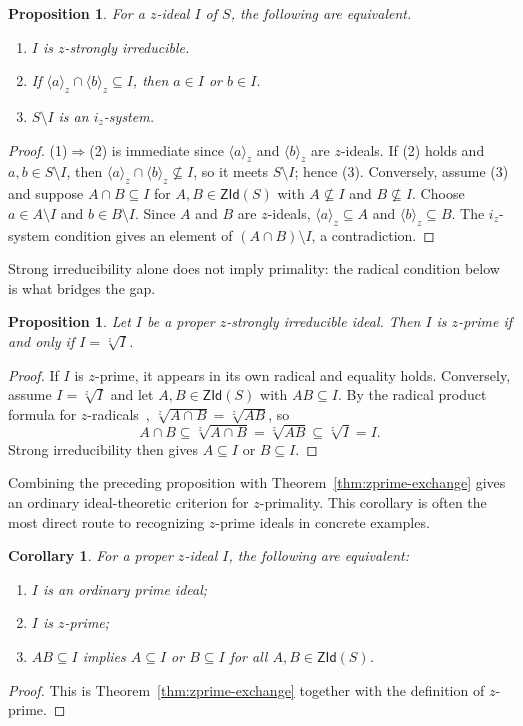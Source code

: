 \documentclass[11pt,leqno]{amsart}
\theoremstyle{plain}
\newtheorem{proposition}[theorem]{Proposition}
\newtheorem{corollary}[theorem]{Corollary}
\theoremstyle{definition}
\theoremstyle{remark}
\numberwithin{equation}{section}
\newcommand{\ZId}{\mathsf{ZId}}
\newcommand{\ideal}[1]{\langle #1\rangle}
\begin{document}
\begin{proposition}\label{loc14}
For a $z$-ideal $I$ of $S$, the following are equivalent.
\begin{enumerate}
\item $I$ is $z$-strongly irreducible.
\item If $\ideal{a}_z\cap\ideal{b}_z\subseteq I$, then $a\in I$ or $b\in I$.
\item $S\setminus I$ is an $i_z$-system.
\end{enumerate}
\end{proposition}
\begin{proof}
(1)$\Rightarrow$(2) is immediate since $\ideal{a}_z$ and $\ideal{b}_z$
are $z$-ideals.
If (2) holds and $a,b\in S\setminus I$, then
$\ideal{a}_z\cap\ideal{b}_z\not\subseteq I$,
so it meets $S\setminus I$; hence (3).
Conversely, assume (3) and suppose $A\cap B\subseteq I$ for
$A,B\in\ZId(S)$ with $A\not\subseteq I$ and $B\not\subseteq I$.
Choose $a\in A\setminus I$ and $b\in B\setminus I$.
Since $A$ and $B$ are $z$-ideals,
$\ideal{a}_z\subseteq A$ and $\ideal{b}_z\subseteq B$.
The $i_z$-system condition gives an element of $(A\cap B)\setminus I$,
a contradiction.
\end{proof}

Strong irreducibility alone does not imply primality:
the radical condition below is what bridges the gap.

\begin{proposition}\label{prop:zstrong-prime-radical}
Let $I$ be a proper $z$-strongly irreducible ideal.
Then $I$ is $z$-prime if and only if $I=\sqrt[z]{I}$.
\end{proposition}
\begin{proof}
If $I$ is $z$-prime, it appears in its own radical and equality holds.
Conversely, assume $I=\sqrt[z]{I}$ and let $A,B\in\ZId(S)$ with
$AB\subseteq I$.
By the radical product formula for $z$-radicals~\cite{AG25},
$\sqrt[z]{A\cap B}=\sqrt[z]{AB}$, so
\[
A\cap B\subseteq\sqrt[z]{A\cap B}=\sqrt[z]{AB}\subseteq\sqrt[z]{I}=I.
\]
Strong irreducibility then gives $A\subseteq I$ or $B\subseteq I$.
\end{proof}

Combining the preceding proposition with Theorem~\ref{thm:zprime-exchange}
gives an ordinary ideal-theoretic criterion for $z$-primality.
This corollary is often the most direct route to recognizing
$z$-prime ideals in concrete examples.

\begin{corollary}\label{cor:ordinary-prime}
For a proper $z$-ideal $I$, the following are equivalent:
\begin{enumerate}
\item $I$ is an ordinary prime ideal;
\item $I$ is $z$-prime;
\item $AB\subseteq I$ implies $A\subseteq I$ or $B\subseteq I$
  for all $A,B\in\ZId(S)$.
\end{enumerate}
\end{corollary}
\begin{proof}
This is Theorem~\ref{thm:zprime-exchange} together with the
definition of $z$-prime.
\end{proof}
\end{document}

